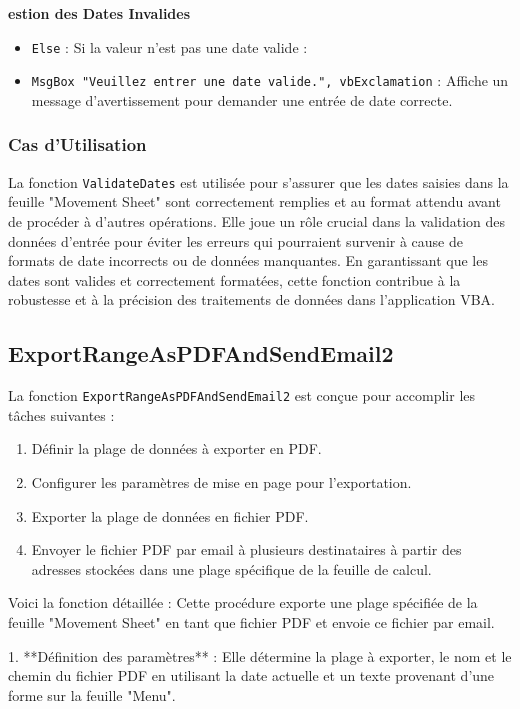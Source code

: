 \documentclass[a4paper, oneside, 12pt, final]{extreport}
\begin{document}
\textbf{estion des Dates Invalides}

\begin{itemize}
    \item \texttt{Else} : Si la valeur n'est pas une date valide :
    \item \texttt{MsgBox "Veuillez entrer une date valide.", vbExclamation} : Affiche un message d'avertissement pour demander une entrée de date correcte.
\end{itemize}

\subsubsection{Cas d'Utilisation}

La fonction \texttt{ValidateDates} est utilisée pour s'assurer que les dates saisies dans la feuille "Movement Sheet" sont correctement remplies et au format attendu avant de procéder à d'autres opérations. Elle joue un rôle crucial dans la validation des données d'entrée pour éviter les erreurs qui pourraient survenir à cause de formats de date incorrects ou de données manquantes. En garantissant que les dates sont valides et correctement formatées, cette fonction contribue à la robustesse et à la précision des traitements de données dans l'application VBA.
\subsection{ExportRangeAsPDFAndSendEmail2}

La fonction \texttt{ExportRangeAsPDFAndSendEmail2} est conçue pour accomplir les tâches suivantes :

\begin{enumerate}
    \item Définir la plage de données à exporter en PDF.
    \item Configurer les paramètres de mise en page pour l'exportation.
    \item Exporter la plage de données en fichier PDF.
    \item Envoyer le fichier PDF par email à plusieurs destinataires à partir des adresses stockées dans une plage spécifique de la feuille de calcul.
\end{enumerate}

\noindent Voici la fonction détaillée :
Cette procédure exporte une plage spécifiée de la feuille "Movement Sheet" en tant que fichier PDF et envoie ce fichier par email. 

1. **Définition des paramètres** : Elle détermine la plage à exporter, le nom et le chemin du fichier PDF en utilisant la date actuelle et un texte provenant d'une forme sur la feuille "Menu".
\end{document}
